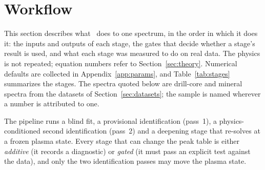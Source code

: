\section{Workflow}
\label{sec:workflow}

This section describes what \alibz\ does to one spectrum, in the order in which it does it:
the inputs and outputs of each stage, the gates that decide whether a stage's result is
used, and what each stage was measured to do on real data.
The physics is not repeated; equation numbers refer to Section~\ref{sec:theory}.
Numerical defaults are collected in Appendix~\ref{app:params}, and
Table~\ref{tab:stages} summarizes the stages.
The spectra quoted below are drill-core and mineral spectra from the datasets of
Section~\ref{sec:datasets}; the sample is named wherever a number is attributed to one.

The pipeline runs a blind fit, a provisional identification (pass~1), a physics-conditioned second identification (pass~2) and a deepening stage that re-solves at a frozen plasma state.
Every stage that can change the peak table is either \emph{additive} (it records a diagnostic) or \emph{gated} (it must pass an explicit test against the data), and only the two identification passes may move the plasma state.

